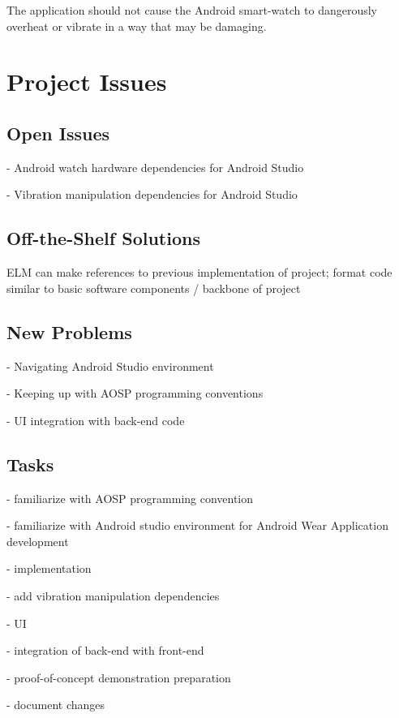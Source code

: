 \documentclass[12pt, titlepage]{article}
\begin{document}
The application should not cause the Android smart-watch to dangerously overheat or vibrate in a way that may be damaging.

\section{Project Issues}

\subsection{Open Issues}

- Android watch hardware dependencies for Android Studio

\noindent - Vibration manipulation dependencies for Android Studio

\subsection{Off-the-Shelf Solutions}

ELM can make references to previous implementation of project; format code similar to basic software components / backbone of project


\subsection{New Problems}

- Navigating Android Studio environment

\noindent - Keeping up with AOSP programming conventions

\noindent - UI integration with back-end code

\subsection{Tasks}

- familiarize with AOSP programming convention

\noindent - familiarize with Android studio environment for Android Wear Application development

\noindent - implementation

- add vibration manipulation dependencies

- UI

- integration of back-end with front-end

\noindent - proof-of-concept demonstration preparation

\noindent - document changes
\end{document}
